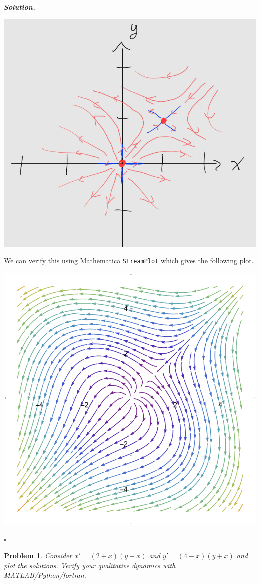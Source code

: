 \documentclass[12pt]{report}
\newtheorem{problem}{Problem}
\newenvironment{solution}[1][\it{Solution}]{\textbf{#1. } }{$\square$}
\begin{document}
\begin{solution}
    \begin{center}
        \includegraphics[width=.6\linewidth]{images/9hand.PNG}
    \end{center}

    \noindent
    We can verify this using Mathematica \verb+StreamPlot+ which gives the following plot.

    \begin{center}
       \includegraphics[width=.6\linewidth]{images/9.png}
    \end{center}


\end{solution}

\newpage



\begin{problem}
    Consider $x' = (2+x)(y-x)$ and $y' = (4-x)(y+x)$ and plot the solutions. Verify your qualitative dynamics with MATLAB/Python/fortran.
\end{problem}
\end{document}
